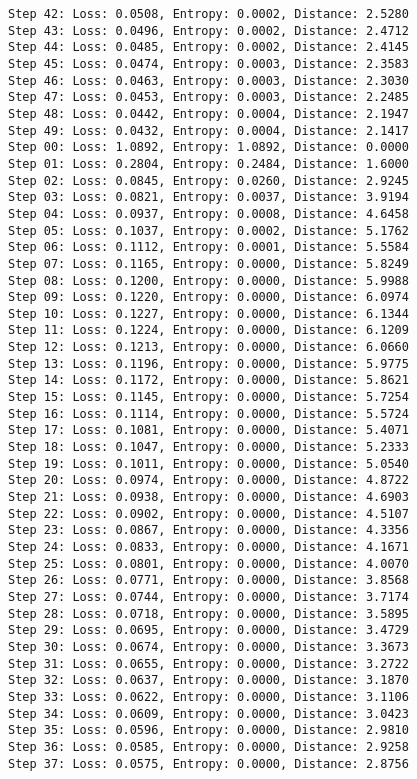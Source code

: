 \documentclass[11pt]{article}
\begin{document}
\begin{Verbatim}[commandchars=\\\{\}]
Step 42: Loss: 0.0508, Entropy: 0.0002, Distance: 2.5280
Step 43: Loss: 0.0496, Entropy: 0.0002, Distance: 2.4712
Step 44: Loss: 0.0485, Entropy: 0.0002, Distance: 2.4145
Step 45: Loss: 0.0474, Entropy: 0.0003, Distance: 2.3583
Step 46: Loss: 0.0463, Entropy: 0.0003, Distance: 2.3030
Step 47: Loss: 0.0453, Entropy: 0.0003, Distance: 2.2485
Step 48: Loss: 0.0442, Entropy: 0.0004, Distance: 2.1947
Step 49: Loss: 0.0432, Entropy: 0.0004, Distance: 2.1417
Step 00: Loss: 1.0892, Entropy: 1.0892, Distance: 0.0000
Step 01: Loss: 0.2804, Entropy: 0.2484, Distance: 1.6000
Step 02: Loss: 0.0845, Entropy: 0.0260, Distance: 2.9245
Step 03: Loss: 0.0821, Entropy: 0.0037, Distance: 3.9194
Step 04: Loss: 0.0937, Entropy: 0.0008, Distance: 4.6458
Step 05: Loss: 0.1037, Entropy: 0.0002, Distance: 5.1762
Step 06: Loss: 0.1112, Entropy: 0.0001, Distance: 5.5584
Step 07: Loss: 0.1165, Entropy: 0.0000, Distance: 5.8249
Step 08: Loss: 0.1200, Entropy: 0.0000, Distance: 5.9988
Step 09: Loss: 0.1220, Entropy: 0.0000, Distance: 6.0974
Step 10: Loss: 0.1227, Entropy: 0.0000, Distance: 6.1344
Step 11: Loss: 0.1224, Entropy: 0.0000, Distance: 6.1209
Step 12: Loss: 0.1213, Entropy: 0.0000, Distance: 6.0660
Step 13: Loss: 0.1196, Entropy: 0.0000, Distance: 5.9775
Step 14: Loss: 0.1172, Entropy: 0.0000, Distance: 5.8621
Step 15: Loss: 0.1145, Entropy: 0.0000, Distance: 5.7254
Step 16: Loss: 0.1114, Entropy: 0.0000, Distance: 5.5724
Step 17: Loss: 0.1081, Entropy: 0.0000, Distance: 5.4071
Step 18: Loss: 0.1047, Entropy: 0.0000, Distance: 5.2333
Step 19: Loss: 0.1011, Entropy: 0.0000, Distance: 5.0540
Step 20: Loss: 0.0974, Entropy: 0.0000, Distance: 4.8722
Step 21: Loss: 0.0938, Entropy: 0.0000, Distance: 4.6903
Step 22: Loss: 0.0902, Entropy: 0.0000, Distance: 4.5107
Step 23: Loss: 0.0867, Entropy: 0.0000, Distance: 4.3356
Step 24: Loss: 0.0833, Entropy: 0.0000, Distance: 4.1671
Step 25: Loss: 0.0801, Entropy: 0.0000, Distance: 4.0070
Step 26: Loss: 0.0771, Entropy: 0.0000, Distance: 3.8568
Step 27: Loss: 0.0744, Entropy: 0.0000, Distance: 3.7174
Step 28: Loss: 0.0718, Entropy: 0.0000, Distance: 3.5895
Step 29: Loss: 0.0695, Entropy: 0.0000, Distance: 3.4729
Step 30: Loss: 0.0674, Entropy: 0.0000, Distance: 3.3673
Step 31: Loss: 0.0655, Entropy: 0.0000, Distance: 3.2722
Step 32: Loss: 0.0637, Entropy: 0.0000, Distance: 3.1870
Step 33: Loss: 0.0622, Entropy: 0.0000, Distance: 3.1106
Step 34: Loss: 0.0609, Entropy: 0.0000, Distance: 3.0423
Step 35: Loss: 0.0596, Entropy: 0.0000, Distance: 2.9810
Step 36: Loss: 0.0585, Entropy: 0.0000, Distance: 2.9258
Step 37: Loss: 0.0575, Entropy: 0.0000, Distance: 2.8756

\end{Verbatim}
\end{document}
